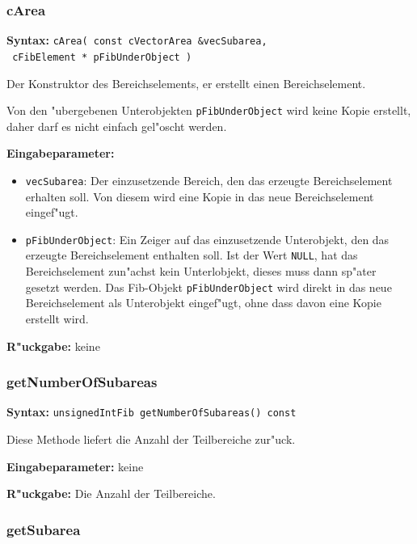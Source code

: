 \subsubsection{cArea}

\textbf{Syntax:} \verb|cArea( const cVectorArea &vecSubarea,| \\\verb| cFibElement * pFibUnderObject )|

\bigskip\noindent
Der Konstruktor des Bereichselements, er erstellt einen Bereichselement.

Von den "ubergebenen Unterobjekten \verb|pFibUnderObject| wird keine Kopie erstellt, daher darf es nicht einfach gel"oscht werden.

\bigskip\noindent
\textbf{Eingabeparameter:}
\begin{itemize}
 \item \verb|vecSubarea|: Der einzusetzende Bereich, den das erzeugte Bereichselement erhalten soll. Von diesem wird eine Kopie in das neue Bereichselement eingef"ugt.
 \item \verb|pFibUnderObject|: Ein Zeiger auf das einzusetzende Unterobjekt, den das erzeugte Bereichselement enthalten soll. Ist der Wert \verb|NULL|, hat das Bereichselement zun"achst kein Unterlobjekt, dieses muss dann sp"ater gesetzt werden. Das Fib-Objekt \verb|pFibUnderObject| wird direkt in das neue Bereichselement als Unterobjekt eingef"ugt, ohne dass davon eine Kopie erstellt wird.
\end{itemize}

\bigskip\noindent
\textbf{R"uckgabe:} keine


\subsubsection{getNumberOfSubareas}

\textbf{Syntax:} \verb|unsignedIntFib getNumberOfSubareas() const|

\bigskip\noindent
Diese Methode liefert die Anzahl der Teilbereiche zur"uck.

\bigskip\noindent
\textbf{Eingabeparameter:} keine

\bigskip\noindent
\textbf{R"uckgabe:} Die Anzahl der Teilbereiche.


\subsubsection{getSubarea}

